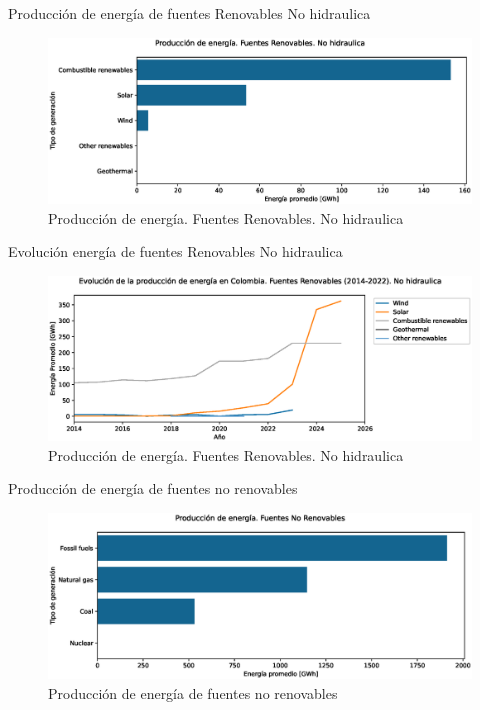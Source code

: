 \documentclass[10pt]{beamer}
\begin{document}
\begin{frame}[fragile]{Producción de energía de fuentes Renovables No hidraulica}
\begin{figure}[t]
		\centering
		\includegraphics[width=0.7\linewidth]{../../reports/fig_14}
		\caption{Producción de energía. Fuentes Renovables. No hidraulica}
		\label{fig:fig14}
\end{figure}
\end{frame}
	
\begin{frame}[fragile]{Evolución energía de fuentes Renovables No hidraulica}
\begin{figure}[t]
	\centering
	\includegraphics[width=1\linewidth]{../../reports/fig_15}
	\caption{Producción de energía. Fuentes Renovables. No hidraulica}
	\label{fig:fig15}
\end{figure}
\end{frame}
	
\begin{frame}[fragile]{Producción de energía de fuentes no renovables}
\begin{figure}[t]
			\centering
			\includegraphics[width=0.9\linewidth]{../../reports/fig_16}
			\caption{Producción de energía de fuentes no renovables}
			\label{fig:fig16}
\end{figure}
\end{frame}
	
\end{document}

